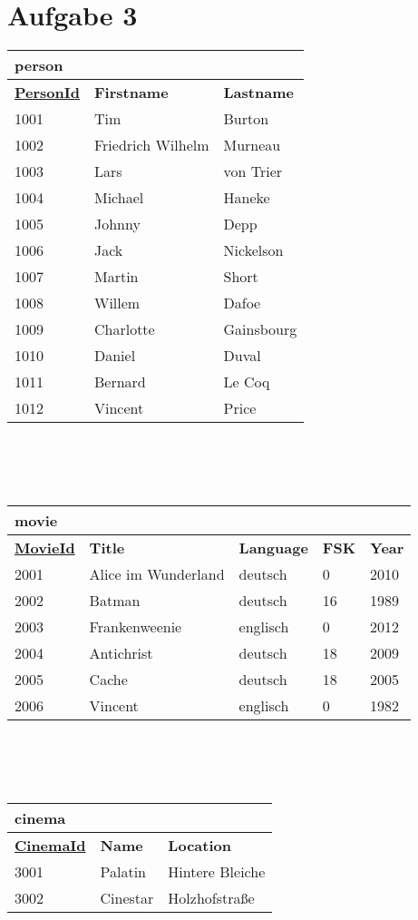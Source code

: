 \documentclass[a4paper]{article}
\begin{document}
\section{Aufgabe 3}
\begin{tabular}{|l|l|l|}
\hline
\textbf{person} & &\\
\hline
\textbf{\uline{PersonId}} & \textbf{Firstname} & \textbf{Lastname}\\
\hline
1001 & Tim & Burton\\
\hline
1002 & Friedrich Wilhelm & Murneau\\
\hline
1003 & Lars & von Trier\\
\hline
1004 & Michael & Haneke\\
\hline
1005 & Johnny & Depp\\
\hline
1006 & Jack & Nickelson\\
\hline
1007 & Martin & Short\\
\hline
1008 & Willem & Dafoe\\
\hline
1009 & Charlotte & Gainsbourg\\
\hline
1010 & Daniel & Duval\\
\hline
1011 & Bernard & Le Coq\\
\hline
1012 & Vincent & Price\\

\hline
\end{tabular}\\
\\
\\
\begin{tabular}{|l|l|l|l|l|}
\hline
\textbf{movie} & & & &\\
\hline
\textbf{\uline{MovieId}} & \textbf{Title} & \textbf{Language} & \textbf{FSK} & \textbf{Year}\\
\hline
2001 & Alice im Wunderland & deutsch & 0 & 2010 \\
\hline
2002 & Batman & deutsch & 16 & 1989 \\
\hline
2003 & Frankenweenie & englisch & 0 & 2012 \\
\hline
2004 & Antichrist & deutsch & 18 & 2009 \\
\hline
2005 & Cache & deutsch & 18 & 2005 \\
\hline
2006 & Vincent & englisch & 0 & 1982 \\
\hline

\end{tabular}\\
\\
\\
\begin{tabular}{|l|l|l|}
\hline
\textbf{cinema} & &\\
\hline
\textbf{\uline{CinemaId}} & \textbf{Name} & \textbf{Location}\\
\hline
3001 & Palatin & Hintere Bleiche\\
\hline
3002 & Cinestar & Holzhofstraße\\
\hline

\end{tabular}\\
\end{document}
